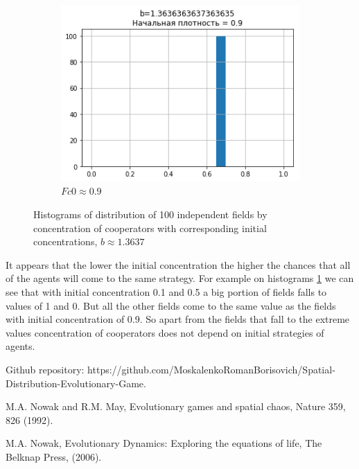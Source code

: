 \documentclass[a4paper]{jpconf}
\begin{document}
\begin{figure}[h]
\begin{subfigure}[b]{0.48\textwidth}
		\includegraphics[width = \textwidth]{b1,3_Fc0,9_hist.png}
		\caption{$Fc0 \approx 0.9$}
	\end{subfigure}
	
	\caption{Histograms of distribution of 100 independent fields by concentration of cooperators with corresponding initial concentrations, $b\approx 1.3637$}
	\label{fig:Fc0 hist}
\end{figure}

It appears that the lower the initial concentration the higher the chances that all of the agents will come to the same strategy. For example on histograms \ref{fig:Fc0 hist} we can see that with initial concentration 0.1 and 0.5 a big portion of fields falls to values of 1 and 0. But all the other fields come to the same value  as the fields with initial concentration of 0.9. So apart from the fields that fall to the extreme values concentration of cooperators does not depend on initial strategies of agents.


\begin{thebibliography}{9}

Github repository: https://github.com/MoskalenkoRomanBorisovich/Spatial-Distribution-Evolutionary-Game. 

M.A. Nowak and R.M. May, Evolutionary games and spatial chaos, Nature 359, 826 (1992).

M.A. Nowak, Evolutionary Dynamics: Exploring the equations of life, The Belknap Press, (2006).

\end{thebibliography}
\end{document}

